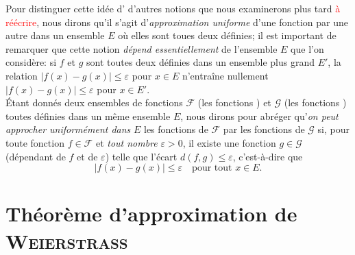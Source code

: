 Pour distinguer cette idée d' d'autres notions que nous examinerons plus tard \textcolor{red}{à réécrire}, nous dirons qu'il s'agit d'\emph{approximation uniforme} d'une fonction par une autre dans un ensemble $E$ où elles sont toues deux définies; il est important de remarquer que cette notion \emph{dépend essentiellement} de l'ensemble $E$ que l'on considère: si $f$ et $g$ sont toutes deux définies dans un ensemble plus grand $E'$, la relation $|f(x) - g(x)| \leqslant \varepsilon$ pour $x \in E$ n'entraîne nullement $|f(x)-g(x)| \leqslant \varepsilon$ pour $x \in E'$. \\
Étant donnés deux ensembles de fonctions $\mathscr{F}$ (les fonctions ) et $\mathscr{G}$ (les fonctions ) toutes définies dans un même ensemble $E$, nous dirons pour abréger qu'\emph{on peut approcher uniformément dans} $E$ les fonctions de $\mathscr{F}$ par les fonctions de $\mathscr{G}$ si, pour toute fonction $f \in \mathscr{F}$ et \emph{tout nombre} $\varepsilon > 0$, il existe une fonction $g \in \mathscr{G}$ (dépendant de $f$ et de $\varepsilon$) telle que l'écart $d(f,g) \leqslant \varepsilon$, c'est-à-dire que 
$$|f(x) - g(x)| \leqslant \varepsilon \quad \text{pour tout } x \in E.$$



\newpage

\section{Théorème d'approximation de \textsc{Weierstrass}}


